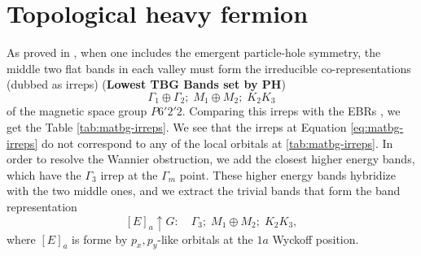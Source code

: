 



\chapter{Topological heavy fermion}

As proved in \cite{all_magic_angles}, when one includes the emergent particle-hole symmetry, the middle two flat bands in each valley must form the irreducible co-representations (dubbed as irreps) (\textbf{Lowest TBG Bands set by PH})
\begin{equation} \label{eq:matbg-irreps}
\Gamma_1 \oplus \Gamma_2; \; M_1 \oplus M_2; \; K_2 K_3
\end{equation}
of the magnetic space group $P6'2'2$. Comparing this irreps with the EBRs \cite{topological_quantum_chemistry2017}, we get the Table \ref{tab:matbg-irreps}. We see that the irreps at Equation \ref{eq:matbg-irreps} do not correspond to any of the local orbitals at \ref{tab:matbg-irreps}. In order to resolve the Wannier obstruction, we add the closest higher energy bands, which have the $\Gamma_3$ irrep at the $\Gamma_m$ point. These higher energy bands hybridize with the two middle ones, and we extract the trivial bands that form the band representation
\begin{equation} \label{eq:trivial-irreps}
[E]_a \uparrow G: \quad \Gamma_3; \; M_1 \oplus M_2; \; K_2 K_3,
\end{equation}
where $[E]_a$ is forme by $p_x, p_y$-like orbitals at the $1a$ Wyckoff position.

